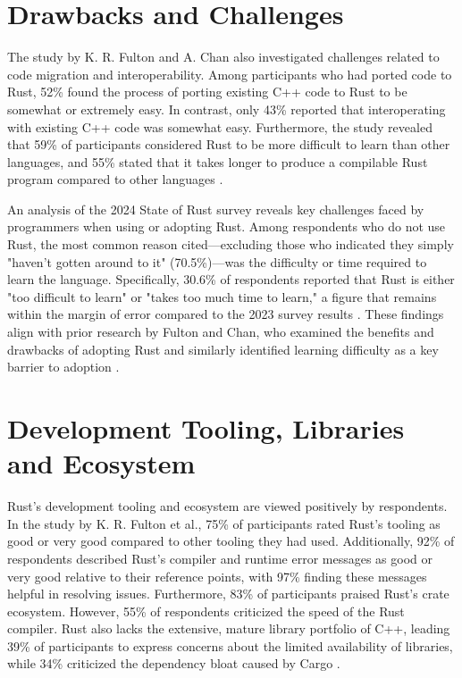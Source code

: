 \section{Drawbacks and Challenges}
The study by K. R. Fulton and A. Chan \cite[]{fultonBenefitsDrawbacksAdopting} also investigated challenges related to code migration and interoperability. Among participants who had ported code to Rust, 52\% found the process of porting existing C++ code to Rust to be somewhat or extremely easy. In contrast, only 43\% reported that interoperating with existing C++ code was somewhat easy. Furthermore, the study revealed that 59\% of participants considered Rust to be more difficult to learn than other languages, and 55\% stated that it takes longer to produce a compilable Rust program compared to other languages \cite[]{fultonBenefitsDrawbacksAdopting}.

An analysis of the 2024 State of Rust survey reveals key challenges faced by programmers when using or adopting Rust. Among respondents who do not use Rust, the most common reason cited—excluding those who indicated they simply "haven't gotten around to it" (70.5\%)—was the difficulty or time required to learn the language. Specifically, 30.6\% of respondents reported that Rust is either "too difficult to learn" or "takes too much time to learn," a figure that remains within the margin of error compared to the 2023 survey results \cite[]{2024StateRust}. These findings align with prior research by Fulton and Chan, who examined the benefits and drawbacks of adopting Rust and similarly identified learning difficulty as a key barrier to adoption \cite[]{fultonBenefitsDrawbacksAdopting}.

\section{Development Tooling, Libraries and Ecosystem}
Rust's development tooling and ecosystem are viewed positively by respondents. In the study by K. R. Fulton et al., 75\% of participants rated Rust's tooling as good or very good compared to other tooling they had used. Additionally, 92\% of respondents described Rust's compiler and runtime error messages as good or very good relative to their reference points, with 97\% finding these messages helpful in resolving issues. Furthermore, 83\% of participants praised Rust's crate ecosystem. However, 55\% of respondents criticized the speed of the Rust compiler. Rust also lacks the extensive, mature library portfolio of C++, leading 39\% of participants to express concerns about the limited availability of libraries, while 34\% criticized the dependency bloat caused by Cargo \cite[]{fultonBenefitsDrawbacksAdopting}.

